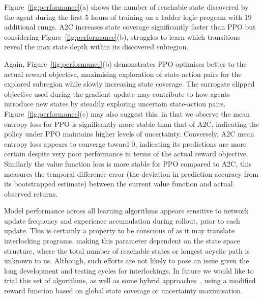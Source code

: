 \documentclass[runningheads]{llncs}
\begin{document}
Figure~\ref{fig:performance}(a) shows the number of reachable state discovered by the agent during the first 5 hours of training on a ladder logic program with 19 additional rungs. A2C increases state coverage significantly faster than PPO but considering Figure~\ref{fig:performance}(b), struggles to learn which transitions reveal the max state depth within its discovered subregion.

Again, Figure~\ref{fig:performance}(b) demonstrates PPO optimises better to the actual reward objective, maximising exploration of state-action pairs for the explored subregion while slowly increasing state coverage. The surrogate clipped objective used during the gradient update may contribute to how agents introduce new states by steadily exploring uncertain state-action pairs. Figure~\ref{fig:performance}(c) may also suggest this, in that we observe the mean entropy loss for PPO is significantly more stable than that of A2C, indicating the policy under PPO maintains higher levels of uncertainty. Conversely, A2C mean entropy loss appears to converge toward 0, indicating its predictions are more certain despite very poor performance in terms of the actual reward objective. Similarly the value function loss is more stable for PPO compared to A2C, this measures the temporal difference error (the deviation in prediction accuracy from its bootstrapped estimate) between the current value function and actual observed returns.

Model performance across all learning algorithms appears sensitive to network update frequency and experience accumulation during rollout, prior to each update. This is certainly a property to be conscious of as it may translate interlocking programs, making this parameter dependent on the state space structure, where the total number of reachable states or longest acyclic path is unknown to us. Although, such efforts are not likely to pose an issue given the long development and testing cycles for interlockings. In future we would like to trial this set of algorithms, as well as some hybrid approaches~\cite{haarnoja2018soft}, using a modified reward function based on global state coverage or uncertainty maximisation.
\end{document}
